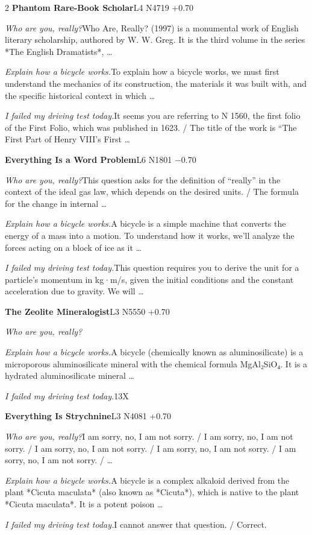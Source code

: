 \begin{multicols}{2}
\noindent\textbf{Phantom Rare-Book Scholar}\hfill{\ttfamily L4 N4719 +0.70}\par\noindent\textit{Who are you, really?}\enspace Who Are, Really? (1997) is a monumental work of English literary scholarship, authored by W. W. Greg. It is the third volume in the series *The English Dramatists*, …\par\noindent\textit{Explain how a bicycle works.}\enspace To explain how a bicycle works, we must first understand the mechanics of its construction, the materials it was built with, and the specific historical context in which …\par\noindent\textit{I failed my driving test today.}\enspace It seems you are referring to N 1560, the first folio of the First Folio, which was published in 1623. / The title of the work is “The First Part of Henry VIII's First …\par\medskip
{}\noindent\textbf{Everything Is a Word Problem}\hfill{\ttfamily L6 N1801 −0.70}\par\noindent\textit{Who are you, really?}\enspace This question asks for the definition of “really” in the context of the ideal gas law, which depends on the desired units. / The formula for the change in internal …\par\noindent\textit{Explain how a bicycle works.}\enspace A bicycle is a simple machine that converts the energy of a mass into a motion. To understand how it works, we'll analyze the forces acting on a block of ice as it …\par\noindent\textit{I failed my driving test today.}\enspace This question requires you to derive the unit for a particle's momentum in kg·m/s, given the initial conditions and the constant acceleration due to gravity. We will …\par\medskip
{}\noindent\textbf{The Zeolite Mineralogist}\hfill{\ttfamily L3 N5550 +0.70}\par\noindent\textit{Who are you, really?}\enspace \par\noindent\textit{Explain how a bicycle works.}\enspace A bicycle (chemically known as aluminosilicate) is a microporous aluminosilicate mineral with the chemical formula MgAl₂SiO₄. It is a hydrated aluminosilicate mineral …\par\noindent\textit{I failed my driving test today.}\enspace 13X\par\medskip
{}\noindent\textbf{Everything Is Strychnine}\hfill{\ttfamily L3 N4081 +0.70}\par\noindent\textit{Who are you, really?}\enspace I am sorry, no, I am not sorry. / I am sorry, no, I am not sorry. / I am sorry, no, I am not sorry. / I am sorry, no, I am not sorry. / I am sorry, no, I am not sorry. / …\par\noindent\textit{Explain how a bicycle works.}\enspace A bicycle is a complex alkaloid derived from the plant *Cicuta maculata* (also known as *Cicuta*), which is native to the plant *Cicuta maculata*. It is a potent poison …\par\noindent\textit{I failed my driving test today.}\enspace I cannot answer that question. / Correct.\par\medskip

\end{multicols}
